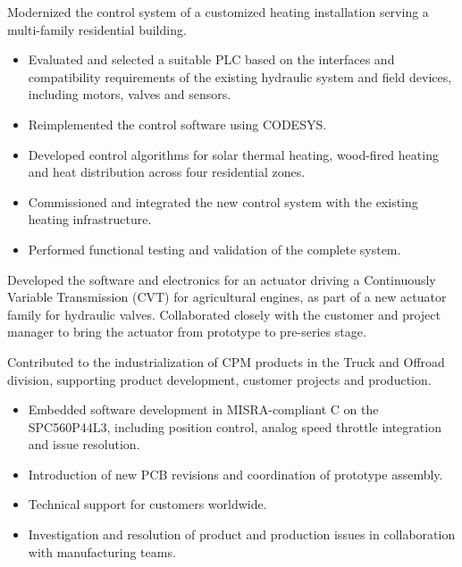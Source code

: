\documentclass[10pt,a4paper,sans]{moderncv}
\begin{document}
    {
        Modernized the control system of a customized heating installation serving a multi-family residential building.
        \begin{itemize}
            \item Evaluated and selected a suitable PLC based on the interfaces and compatibility requirements of the existing hydraulic system and field devices, including motors, valves and sensors.
            \item Reimplemented the control software using CODESYS.
            \item Developed control algorithms for solar thermal heating, wood-fired heating and heat distribution across four residential zones.
            \item Commissioned and integrated the new control system with the existing heating infrastructure.
            \item Performed functional testing and validation of the complete system.
        \end{itemize}
    }
    {
        Developed the software and electronics for an actuator driving a Continuously Variable Transmission (CVT) for agricultural engines, as part of a new actuator family for hydraulic valves. Collaborated closely with the customer and project manager to bring the actuator from prototype to pre-series stage.
    }
    {
        Contributed to the industrialization of CPM products in the Truck and Offroad division, supporting product development, customer projects and production.
        \begin{itemize}
            \item Embedded software development in MISRA-compliant C on the SPC560P44L3, including position control, analog speed throttle integration and issue resolution.
            \item Introduction of new PCB revisions and coordination of prototype assembly.
            \item Technical support for customers worldwide.
            \item Investigation and resolution of product and production issues in collaboration with manufacturing teams.
        \end{itemize}
    }
\end{document}
